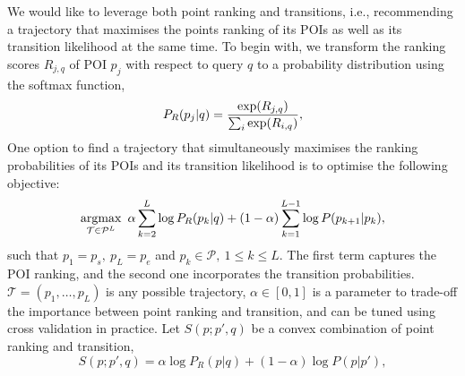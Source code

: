 We would like to leverage both point ranking and transitions,
i.e., recommending a trajectory that maximises the points ranking of its POIs as well as its transition likelihood at the same time.
To begin with, we transform the ranking scores $R_{j,q}$ of POI $p_j$ with respect to query $q$
to a probability distribution using the softmax function,
\eqmoveup
\begin{equation}
\eqmoveup
\label{eq:rankprob}
P_R(p_j | q) = \frac{\exp(R_{j,q})}{\sum_i \exp(R_{i,q})},
\end{equation}
One option to find a trajectory that simultaneously maximises the ranking probabilities of its POIs and its transition likelihood is to optimise the following objective:
\eqmoveup
\vspace{-0.3em}
\begin{equation*}\eqmoveup
    \argmax_{\mathcal{T} \in \mathcal{P}^L} ~\alpha \sum_{k=2}^{L} \log P_R(p_{k} | q) +
                                     (1-\alpha) \sum_{k=1}^{L-1} \log P(p_{k+1} | p_{k}),
\end{equation*}
such that
$p_{1} = p_s, ~ p_{L} = p_e$ and
$p_{k} \in \mathcal{P}, ~1 \le k \le L$.
The first term captures the POI ranking, and the second one incorporates the transition probabilities.
$\mathcal{T} = (p_{1}, \dots, p_{L})$ is any possible trajectory,
$\alpha \in [0, 1]$ is a parameter to trade-off the importance between point ranking and transition,
and can be tuned using cross validation in practice.
Let $S(p; p', q)$ be a convex combination of point ranking and transition,
\eqmoveup
\vspace{-0.3em}
\begin{equation}\label{eq:combined-score}
    S(p; p', q)  = \alpha \log P_R(p|q) + (1-\alpha) \log P(p|p'),
\end{equation}
